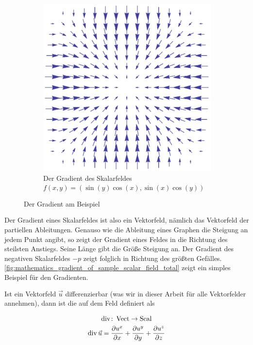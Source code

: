 \begin{figure}[ht]
\begin{subfigure}[b]{0.5\textwidth}
		\includegraphics[width=\textwidth]{images/gradient_of_scalar_field}
		\caption{Der Gradient des Skalarfeldes $f(x,y)=(\sin(y)\cos(x),\sin(x)\cos(y))$}
		\label{fig:mathematics_gradient_of_sample_scalar_field}
	\end{subfigure}
	\caption{Der Gradient am Beispiel}
	\label{fig:mathematics_gradient_of_sample_scalar_field_total}
\end{figure}

Der Gradient eines Skalarfeldes ist also ein Vektorfeld, nämlich das Vektorfeld
der partiellen Ableitungen. Genauso wie die Ableitung eines Graphen die Steigung
an jedem Punkt angibt, so zeigt der Gradient eines Feldes in die Richtung des
steilsten Anstiegs. Seine Länge gibt die Größe Steigung an. Der Gradient des
negativen Skalarfeldes $-p$ zeigt folglich in Richtung des größten Gefälles.
\autoref{fig:mathematics_gradient_of_sample_scalar_field_total} zeigt ein simples
Beispiel für den Gradienten.

Ist ein Vektorfeld $\vec{u}$ differenzierbar (was wir in dieser Arbeit für alle
Vektorfelder annehmen), dann ist die  auf dem
Feld definiert als

\begin{gather}
\operatorname*{div} \colon \operatorname*{Vect} \to \operatorname*{Scal} \\
\operatorname*{div} \vec{u}
=
\frac{\partial u^x}{\partial x} +
\frac{\partial u^y}{\partial y} +
\frac{\partial u^z}{\partial z}
\end{gather}

